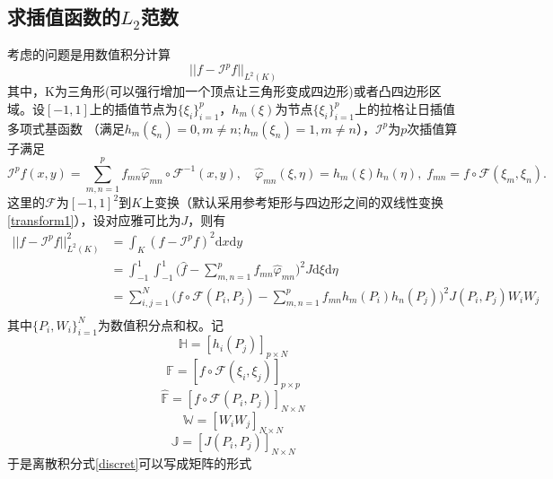 \documentclass[10pt,reqno, final]{ctexartutf8}
\begin{document}
\subsection{求插值函数的$L_2$范数}
考虑的问题是用数值积分计算
\begin{equation}%
  || f - \mathcal I^p f ||_{L^2(K)}
\end{equation}
其中，K为三角形(可以强行增加一个顶点让三角形变成四边形)或者凸四边形区域。设$[-1,1]$上的插值节点为$\{\xi_i\}_{i=1}^p$，$h_m(\xi)$为节点$\{\xi_i\}_{i=1}^p$上的拉格让日插值多项式基函数
（满足$h_m(\xi_n)=0,m\neq n; h_m(\xi_n)=1,m\neq n$），$ \mathcal I^p$为$p$次插值算子满足
\begin{equation}%
   \mathcal I^p f(x,y)= \sum_{m,n=1}^{p} f_{mn} \widehat{\varphi}_{mn} \circ \mathscr F^{-1}(x,y),
   \quad \widehat{\varphi}_{mn}(\xi, \eta) = h_m(\xi)h_n(\eta),
   \;f_{mn} =  f\circ\mathscr F(\xi_m, \xi_n)  .
\end{equation}
这里的$\mathscr F$为$[-1,1]^2$到$K$上变换（默认采用参考矩形与四边形之间的双线性变换\eqref{transform1}），设对应雅可比为$J$，则有
\begin{equation}\label{discret}
\begin{split}
|| f - \mathcal I^p f ||_{L^2(K)} ^2
&= \int_{K} (f - \mathcal I^p f)^2 \text{d}x\text{d}y\\
&= \int_{-1}^{1}\!\!\int_{-1}^{1} \Big(\widehat f -  \sum_{m,n=1}^{p} f_{mn} \widehat{\varphi}_{mn} \Big)^2 J \text{d}\xi\text{d}\eta\\
&= \sum_{i,j=1}^{N} \Big(f\circ\mathscr F(P_i, P_j) -  \sum_{m,n=1}^{p} f_{mn}h_m(P_i)h_n(P_j)\Big)^2 J(P_i, P_j)W_iW_j \\
\end{split}
\end{equation}
其中$\{P_i,W_i\}_{i=1}^{N}$为数值积分点和权。记
\[\mathbb{H} = [h_i(P_j)]_{p\times N}\]
\[ \mathbb{F} = [ f\circ\mathscr F(\xi_i, \xi_j)]_{p\times p} \]
\[ \mathbb{\widehat F} = [ f\circ\mathscr F(P_i, P_j)]_{N\times N}\]
\[\mathbb{W} = [W_iW_j]_{N\times N}\]
\[\mathbb{J} = [J(P_i, P_j)]_{N\times N}\]
于是离散积分式\eqref{discret}可以写成矩阵的形式
\end{document}
